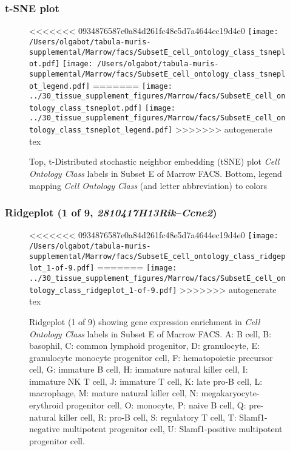 \clearpage
\subsubsection{t-SNE plot}
\begin{figure}[h]
\centering
<<<<<<< 0934876587e0a84d261fc48e5d7a4644ec19d4e0
\texttt{[image: /Users/olgabot/tabula-muris-supplemental/Marrow/facs/SubsetE\_cell\_ontology\_class\_tsneplot.pdf]}
\texttt{[image: /Users/olgabot/tabula-muris-supplemental/Marrow/facs/SubsetE\_cell\_ontology\_class\_tsneplot\_legend.pdf]}
=======
\texttt{[image: ../30\_tissue\_supplement\_figures/Marrow/facs/SubsetE\_cell\_ontology\_class\_tsneplot.pdf]}
\texttt{[image: ../30\_tissue\_supplement\_figures/Marrow/facs/SubsetE\_cell\_ontology\_class\_tsneplot\_legend.pdf]}
>>>>>>> autogenerate tex
\caption{Top, t-Distributed stochastic neighbor embedding (tSNE) plot  \emph{Cell Ontology Class} labels in Subset E of Marrow FACS. Bottom, legend mapping \emph{Cell Ontology Class} (and letter abbreviation) to colors}
\end{figure}


\clearpage

\subsubsection{Ridgeplot (1 of 9, \emph{2810417H13Rik}--\emph{Ccne2})}
\begin{figure}[h]
\centering
<<<<<<< 0934876587e0a84d261fc48e5d7a4644ec19d4e0
\texttt{[image: /Users/olgabot/tabula-muris-supplemental/Marrow/facs/SubsetE\_cell\_ontology\_class\_ridgeplot\_1-of-9.pdf]}
=======
\texttt{[image: ../30\_tissue\_supplement\_figures/Marrow/facs/SubsetE\_cell\_ontology\_class\_ridgeplot\_1-of-9.pdf]}
>>>>>>> autogenerate tex

\caption{ Ridgeplot (1 of 9)  showing gene expression enrichment in \emph{Cell Ontology Class} labels in Subset E of Marrow FACS. A: B cell, B: basophil, C: common lymphoid progenitor, D: granulocyte, E: granulocyte monocyte progenitor cell, F: hematopoietic precursor cell, G: immature B cell, H: immature natural killer cell, I: immature NK T cell, J: immature T cell, K: late pro-B cell, L: macrophage, M: mature natural killer cell, N: megakaryocyte-erythroid progenitor cell, O: monocyte, P: naive B cell, Q: pre-natural killer cell, R: pro-B cell, S: regulatory T cell, T: Slamf1-negative multipotent progenitor cell, U: Slamf1-positive multipotent progenitor cell.}
\end{figure}


